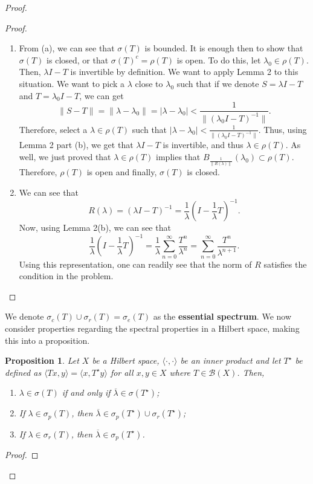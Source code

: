 \documentclass[oneside]{book}
\newtheorem{proposition}{Proposition}
\newcommand{\B}{\mathscr{B}}
\newcommand{\la}{\langle}
\newcommand{\ra}{\rangle}
\newcommand{\sumo}{\sum\limits_{n = 0}^{\infty}}
\newcommand{\ov}{\overline}
\newcommand{\sbs}{\subset}
\newcommand{\Ts}{T^{\star}}
\begin{document}
\begin{proof}
\begin{proof}
\begin{enumerate}
\item[(b)] From (a), we can see that $\sigma(T)$ is bounded. It is enough then to show that $\sigma(T)$ is closed, or that $\sigma(T)^c = \rho(T)$ is open. To do this, let $\lambda_0 \in \rho(T)$. Then, $\lambda I - T$ is invertible by definition. We want to apply Lemma 2 to this situation. We want to pick a $\lambda$ close to $\lambda_0$ such that if we denote $S = \lambda I - T$ and $T = \lambda_0 I - T$, we can get 
\[ \| S - T \| = \| \lambda - \lambda_0 \| = |\lambda - \lambda_0| < \frac{1}{\| (\lambda_0 I - T)^{-1} \|}.\]
Therefore, select a $\lambda \in \rho(T)$ such that $ |\lambda - \lambda_0| < \frac{1}{\| (\lambda_0 I - T)^{-1} \|}$. Thus, using Lemma 2 part (b), we get that $\lambda I - T$ is invertible, and thus $\lambda \in \rho(T)$. As well, we just proved that $\lambda \in \rho(T)$ implies that $B_{\frac{1}{\| R(\lambda) \|}}(\lambda_0) \sbs \rho(T)$. Therefore, $\rho(T)$ is open and finally, $\sigma(T)$ is closed. 
\item[(c)] We can see that 
\[ R(\lambda) = (\lambda I - T)^{-1} = \frac{1}{\lambda} \left(I - \frac{1}{\lambda}T\right)^{-1}. \]
Now, using Lemma 2(b), we can see that 
\[ \frac{1}{\lambda} \left(I - \frac{1}{\lambda}T\right)^{-1} =  \frac{1}{\lambda} \sumo \frac{T^n}{\lambda^n} = \sumo \frac{T^n}{\lambda^{n+1}}.\]
Using this representation, one can readily see that the norm of $R$ satisfies the condition in the problem. 
\end{enumerate}
\end{proof}
We denote $\sigma_c(T) \cup \sigma_r(T) = \sigma_e(T)$ as the \textbf{essential spectrum}. We now consider properties regarding the spectral properties in a Hilbert space, making this into a proposition.
\begin{proposition}
Let $X$ be a Hilbert space, $\la \cdot, \cdot \ra$ be an inner product and let $\Ts$ be defined as $\la Tx, y \ra = \la x, \Ts y \ra$ for all $x, y \in X$ where $T \in \B(X)$. Then,
\begin{enumerate}
\item[(a)] $\lambda \in \sigma(T)$ if and only if $\ov{\lambda} \in \sigma(\Ts)$;
\item[(b)] If $\lambda \in \sigma_p(T)$, then $\ov{\lambda} \in \sigma_p(\Ts) \cup \sigma_r(\Ts)$;
\item[(c)] If $\lambda \in \sigma_r(T)$, then $\ov{\lambda} \in \sigma_p(\Ts)$.
\end{enumerate}
\end{proposition}
\begin{proof}

\end{proof}
\end{proof}
\end{document}
